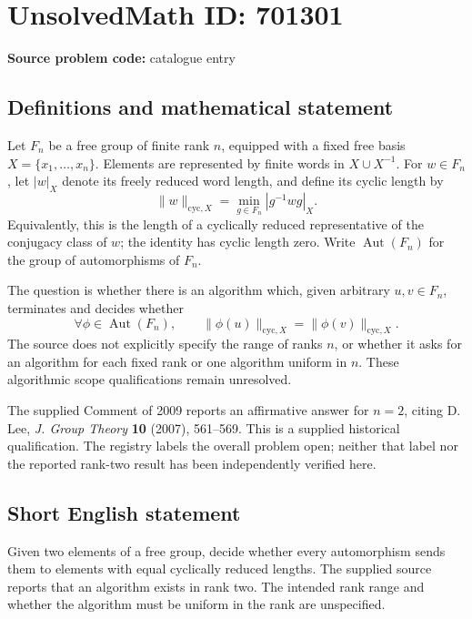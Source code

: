 \documentclass[11pt]{article}
\begin{document}
\section*{UnsolvedMath ID: 701301}
\textbf{Source problem code:} catalogue entry
\subsection{Definitions and mathematical statement}
Let \(F_n\) be a free group of finite rank \(n\), equipped with a fixed free basis \(X=\{x_1,\ldots,x_n\}\). Elements are represented by finite words in \(X\cup X^{-1}\). For \(w\in F_n\), let \(|w|_X\) denote its freely reduced word length, and define its cyclic length by
\[
\|w\|_{\mathrm{cyc},X}=\min_{g\in F_n}|g^{-1}wg|_X.
\]
Equivalently, this is the length of a cyclically reduced representative of the conjugacy class of \(w\); the identity has cyclic length zero. Write \(\operatorname{Aut}(F_n)\) for the group of automorphisms of \(F_n\).

The question is whether there is an algorithm which, given arbitrary \(u,v\in F_n\), terminates and decides whether
\[
\forall\phi\in\operatorname{Aut}(F_n),\qquad
\|\phi(u)\|_{\mathrm{cyc},X}=\|\phi(v)\|_{\mathrm{cyc},X}.
\]
The source does not explicitly specify the range of ranks \(n\), or whether it asks for an algorithm for each fixed rank or one algorithm uniform in \(n\). These algorithmic scope qualifications remain unresolved.

The supplied Comment of 2009 reports an affirmative answer for \(n=2\), citing D. Lee, \emph{J. Group Theory} \textbf{10} (2007), 561--569. This is a supplied historical qualification. The registry labels the overall problem open; neither that label nor the reported rank-two result has been independently verified here.
\subsection{Short English statement}
Given two elements of a free group, decide whether every automorphism sends them to elements with equal cyclically reduced lengths. The supplied source reports that an algorithm exists in rank two. The intended rank range and whether the algorithm must be uniform in the rank are unspecified.
\end{document}
